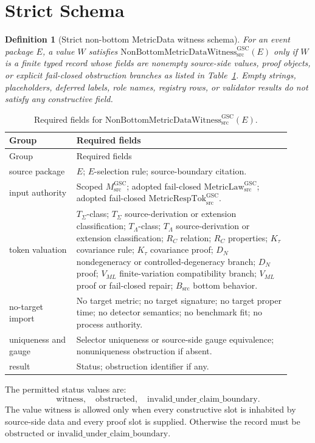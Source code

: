 \documentclass[11pt]{article}
\newtheorem{definition}{Definition}
\newcommand{\MsrcGSC}{M_{\mathrm{src}}^{\mathrm{GSC}}}
\newcommand{\MetricLaw}{\mathrm{MetricLaw}_{\mathrm{src}}^{\mathrm{GSC}}}
\newcommand{\MetricRespTok}{\mathrm{MetricRespTok}_{\mathrm{src}}^{\mathrm{GSC}}}
\newcommand{\Witness}{\mathrm{NonBottomMetricDataWitness}_{\mathrm{src}}^{\mathrm{GSC}}}
\begin{document}
\section{Strict Schema}

\begin{definition}[Strict non-bottom MetricData witness schema]
For an event package \(E\), a value \(W\) satisfies
\(\Witness(E)\) only if \(W\) is a finite typed record whose fields are
nonempty source-side values, proof objects, or explicit fail-closed obstruction
branches as listed in Table~\ref{tab:schema}. Empty strings, placeholders,
deferred labels, role names, registry rows, or validator results do not satisfy
any constructive field.
\end{definition}

\begin{longtable}{p{0.22\linewidth}p{0.70\linewidth}}
\caption{Required fields for \(\Witness(E)\).}\label{tab:schema}\\
\toprule
Group & Required fields \\
\midrule
\endfirsthead
\toprule
Group & Required fields \\
\midrule
\endhead
source package &
\(E\); \(E\)-selection rule; source-boundary citation. \\
input authority &
Scoped \(\MsrcGSC\); adopted fail-closed \(\MetricLaw\); adopted fail-closed
\(\MetricRespTok\). \\
token valuation &
\(T_{\Sigma}\)-class; \(T_{\Sigma}\) source-derivation or extension
classification; \(T_{\Lambda}\)-class; \(T_{\Lambda}\) source-derivation or
extension classification; \(R_C\) relation; \(R_C\) properties; \(K_{\tau}\)
covariance rule; \(K_{\tau}\) covariance proof; \(D_N\) nondegeneracy or
controlled-degeneracy branch; \(D_N\) proof; \(V_{ML}\) finite-variation
compatibility branch; \(V_{ML}\) proof or fail-closed repair; \(B_{\mathrm{src}}\)
bottom behavior. \\
no-target import &
No target metric; no target signature; no target proper time; no detector
semantics; no benchmark fit; no process authority. \\
uniqueness and gauge &
Selector uniqueness or source-side gauge equivalence; nonuniqueness obstruction
if absent. \\
result &
Status; obstruction identifier if any. \\
\bottomrule
\end{longtable}

The permitted status values are:
\[
  \mathrm{witness},\quad
  \mathrm{obstructed},\quad
  \mathrm{invalid\_under\_claim\_boundary}.
\]
The value \(\mathrm{witness}\) is allowed only when every constructive slot is
inhabited by source-side data and every proof slot is supplied. Otherwise the
record must be \(\mathrm{obstructed}\) or
\(\mathrm{invalid\_under\_claim\_boundary}\).
\end{document}
